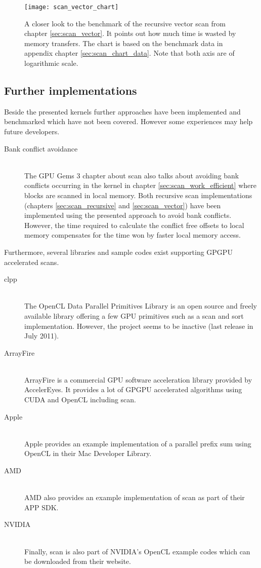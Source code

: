 \begin{figure}
\centering
\texttt{[image: scan\_vector\_chart]}
\caption{A closer look to the benchmark of the recursive vector scan from chapter \ref{sec:scan_vector}. It points out how much time is wasted by memory transfers. The chart is based on the benchmark data in appendix chapter \ref{sec:scan_chart_data}. Note that both axis are of logarithmic scale. }
\label{fig:scan_mem_transfer_chart}
\end{figure}

\subsection{Further implementations}
Beside the presented kernels further approaches have been implemented and benchmarked which have not been covered. However some experiences may help future developers.

\begin{description}
	\item[Bank conflict avoidance] \hfill \\
	The GPU Gems 3 chapter about scan \cite{gpu_gems_3_chapter_39} also talks about avoiding bank conflicts occurring in the kernel in chapter \ref{sec:scan_work_efficient} where blocks are scanned in local memory. Both recursive scan implementations (chapters \ref{sec:scan_recursive} and \ref{sec:scan_vector}) have been implemented using the presented approach to avoid bank conflicts. However, the time required to calculate the conflict free offsets to local memory compensates for the time won by faster local memory access.
\end{description}

Furthermore, several libraries and sample codes exist supporting GPGPU accelerated scans.

\begin{description}
   \item[clpp \cite{clpp}] \hfill \\
   The OpenCL Data Parallel Primitives Library is an open source and freely available library offering a few GPU primitives such as a scan and sort implementation. However, the project seems to be inactive (last release in July 2011).
   \item[ArrayFire \cite{arrayfire}] \hfill \\
   ArrayFire is a commercial GPU software acceleration library provided by AccelerEyes. It provides a lot of GPGPU accelerated algorithms using CUDA and OpenCL including scan.
   \item[Apple \cite{apple_scan}] \hfill \\
   Apple provides an example implementation of a parallel prefix sum using OpenCL in their Mac Developer Library.
   \item[AMD \cite{amd_app_sdk}] \hfill \\
   AMD also provides an example implementation of scan as part of their APP SDK.
   \item[NVIDIA \cite{nvidia_opencl_samples}] \hfill \\
   Finally, scan is also part of NVIDIA's OpenCL example codes which can be downloaded from their website.
\end{description}

